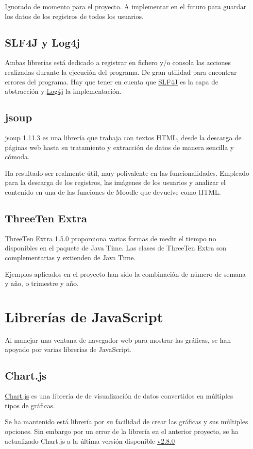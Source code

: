 Ignorado de momento para el proyecto. A implementar en el futuro para guardar los datos de los registros de todos los usuarios.

\subsection{SLF4J y Log4j}
Ambas librerías está dedicado a registrar en fichero y/o consola las acciones realizadas durante la ejecución del programa. De gran utilidad para encontrar errores del programa. 
Hay que tener en cuenta que \href{https://www.slf4j.org/}{SLF4J} es la capa de abstracción y \href{https://logging.apache.org/log4j}{Log4j} la implementación.

\subsection{jsoup}
\href{https://jsoup.org/}{jsoup 1.11.3} es una librería que trabaja con textos HTML, desde la descarga de páginas web hasta su tratamiento y extracción de datos de manera sencilla y cómoda.

Ha resultado ser realmente útil, muy polivalente en las funcionalidades. Empleado para la descarga de los registros, las imágenes de los usuarios y analizar el contenido en una de las funciones de Moodle que devuelve como HTML.

\subsection{ThreeTen Extra}
\href{https://www.threeten.org/threeten-extra/}{ThreeTen Extra 1.5.0} proporciona varias formas de medir el tiempo no disponibles en el paquete de Java Time. Las clases de ThreeTen Extra son complementarias y extienden de Java Time.

Ejemplos aplicados en el proyecto han sido la combinación de número de semana y año, o trimestre y año.

\section{Librerías de JavaScript}

Al manejar una ventana de navegador web para mostrar las gráficas, se han apoyado por varias librerías de JavaScript.

\subsection{Chart.js}
\href{https://www.chartjs.org/}{Chart.js} es una librería de de visualización de datos convertidos en múltiples tipos de gráficas.

Se ha mantenido está librería por su facilidad de crear las gráficas y sus múltiples opciones. Sin embargo por un error de la librería en el anterior proyecto, se ha actualizado Chart.js a la última versión disponible \href{https://www.chartjs.org/dist/2.8.0/Chart.min.js}{v2.8.0}





